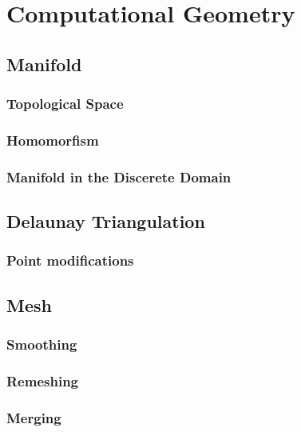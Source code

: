 \chapter{Computational Geometry}
\section{Manifold}
\subsection{Topological Space}
\subsection{Homomorfism}
\subsection{Manifold in the Discerete Domain}
\section{Delaunay Triangulation}
\subsection{Point modifications}
\section{Mesh}
\subsection{Smoothing}
\subsection{Remeshing}
\subsection{Merging}